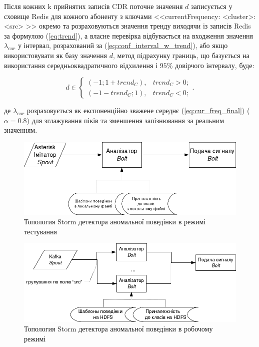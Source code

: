 Після кожних k прийнятих записів CDR поточне значення $d$ записується у сховище Redis для кожного абоненту з ключами <<currentFrequency: <cluster>: <src> >> окремо та розраховуються значення тренду виходячи із записів Redis за формулою (\ref{eq:trend}), а власне перевірка відбувається на входження значення $\lambda_{cur}$ у інтервал, розрахований за (\ref{eq:conf_interval_w_trend}), або якщо використовувати як базу значення $d$, метод підрахунку границь, що базується на використання середньоквадратичного відхилення і $95\%$ довірчого інтервалу, буде:

\begin{equation}\label{eq:conf_interval_w_trend_real} 
  d \in \begin{cases}
    (-1; 1 + trend_{C}), & trend_{C} > 0;\\
    (-1 - trend_{C}; 1), & trend_{C} < 0;
  \end{cases}
  .
\end{equation} %

де $\lambda_{cur}$ розраховується як експоненційно зважене середнє (\ref{eq:cur_freq_final}) ($\alpha = 0.8$) для зглажування піків та зменшення запізнювання за реальним значенням.

\begin{figure}[h]
        \begin{center}
            \includegraphics[scale=0.6]{resources/analys-1.png}
        \end{center}
        \caption{Топология Storm детектора аномальної поведінки в режимі тестування}
        \label{fig:topology-test}
\end{figure}

\begin{figure}[h]
        \begin{center}
            \includegraphics[scale=0.7]{resources/analys-2.png}
        \end{center}
        \caption{Топология Storm детектора аномальної поведінки в робочому режимі}
        \label{fig:topology-prod}
\end{figure}

